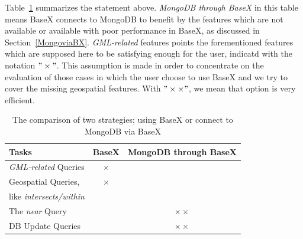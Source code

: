 \documentclass[a4paper,12pt]{article}
\begin{document}


Table~\ref{t.comparisonBaseXMongo} summarizes the statement above. \textit{MongoDB through BaseX} in this table means BaseX connects to MongoDB to benefit by the features which are not available or available with poor performance in BaseX, as discussed in Section~\ref{MongoviaBX}. \textit{GML-related} features points the forementioned features which are supposed here to be satisfying enough for the user, indicatd with the notation $"\times"$. This assumption is made in order to concentrate on the evaluation of those cases in which the user choose to use BaseX and we try to cover the missing geospatial features.
With $"\times\times"$, we mean that option is very efficient.
\vspace{10px}
\begin{table}
\centering
\begin{tabular}{|l | c | c|}\hline
\textbf{Tasks} & \textbf{BaseX} & \textbf{MongoDB through BaseX}\\\hline
 \textit{GML-related} Queries & $\times$ &\\\hline
 Geospatial Queries,  & $\times$ &\\
like \textit{intersects/within} & & \\\hline
 The \textit{near} Query & &$\times\times$ \\\hline
 DB Update Queries & &$\times\times$ 
\\\hline
\end{tabular}
\caption{The comparison of two strategies; using BaseX or connect to MongoDB via BaseX}
\label{t.comparisonBaseXMongo}
\end{table}
\vspace{10px}
\end{document}
